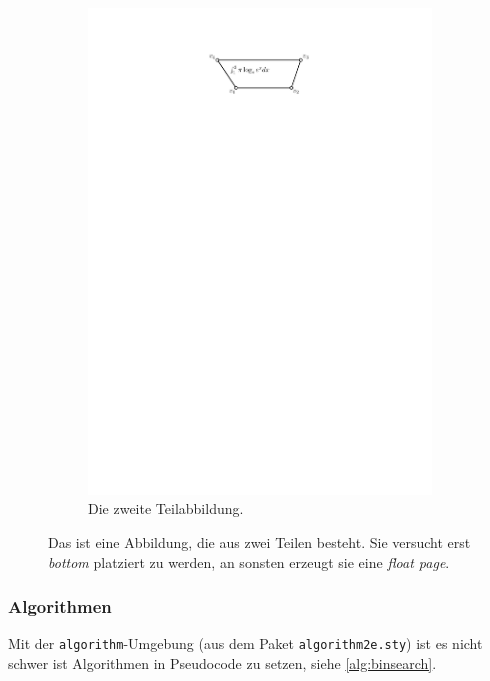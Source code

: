 \documentclass[bachelor,german]{algothesis}
\begin{document}
\begin{figure}[bp]
  \begin{subfigure}{.48\textwidth}
    \centering
    \includegraphics[page=2]{trapez}
    \caption{Die zweite Teilabbildung.}
    \label{fig:trapez-zwei}
  \end{subfigure}
  \caption{Das ist eine Abbildung, die aus zwei Teilen besteht. Sie versucht erst \emph{bottom} platziert zu werden, an sonsten erzeugt sie eine \emph{float page}.}
  \label{fig:zwei-trapeze}
\end{figure}

\subsubsection{Algorithmen} 
Mit der \verb+algorithm+-Umgebung (aus dem Paket \verb+algorithm2e.sty+) ist es nicht schwer ist Algorithmen in Pseudocode zu setzen, siehe \cref{alg:binsearch}.
\end{document}
